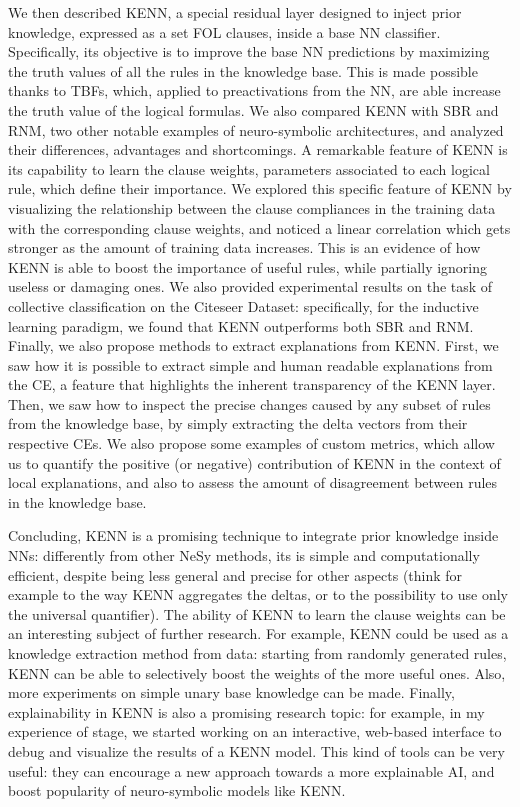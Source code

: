 We then described KENN, a special residual layer designed to inject prior knowledge, expressed as a set FOL clauses, inside a base NN classifier. Specifically, its objective is to improve the base NN predictions by maximizing the truth values of all the rules in the knowledge base. This is made possible thanks to TBFs, which, applied to preactivations from the NN, are able increase the truth value of the logical formulas. We also compared KENN with SBR and RNM, two other notable examples of neuro-symbolic architectures, and analyzed their differences, advantages and shortcomings.
A remarkable feature of KENN is its capability to learn the clause weights, parameters associated to each logical rule, which define their importance. We explored this specific feature of KENN by visualizing the relationship between the clause compliances in the training data with the corresponding clause weights, and noticed a linear correlation which gets stronger as the amount of training data increases. This is an evidence of how KENN is able to boost the importance of useful rules, while partially ignoring useless or damaging ones. We also provided experimental results on the task of collective classification on the Citeseer Dataset: specifically, for the inductive learning paradigm, we found that KENN outperforms both SBR and RNM. Finally, we also propose methods to extract explanations from KENN. 
\textcolor{unipd}{First, we saw how it is possible to extract simple and human readable explanations from the CE, a feature that highlights the inherent transparency of the KENN layer}. Then, we saw how to inspect the precise changes caused by any subset of rules from the knowledge base, by simply extracting the delta vectors from their respective CEs. We also propose some examples of custom metrics, which allow us to quantify the positive (or negative) contribution of KENN in the context of local explanations, and also to assess the amount of disagreement between rules in the knowledge base.

Concluding, KENN is a promising technique to integrate prior knowledge inside NNs: differently from other NeSy methods, its is simple and computationally efficient, despite being less general and precise for other aspects (think for example to the way KENN aggregates the deltas, or to the possibility to use only the universal quantifier). The ability of KENN to learn the clause weights can be an interesting subject of further research. For example, KENN could be used as a knowledge extraction method from data: starting from randomly generated rules, KENN can be able to selectively boost the weights of the more useful ones. Also, more experiments on simple unary base knowledge can be made. 
Finally, explainability in KENN is also a promising research topic: for example, in my experience of stage, we started working on an interactive, web-based interface to debug and visualize the results of a KENN model. This kind of tools can be very useful: they can encourage a new approach towards a more explainable AI, and boost popularity of neuro-symbolic models like KENN. 